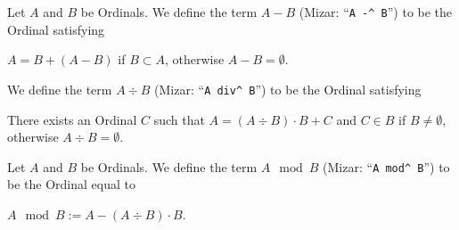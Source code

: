 \documentclass{article}
\begin{document}
\begin{definition}
Let $A$ and $B$ be Ordinals.
We define the term $A-B$ (Mizar: ``\verb#A -^ B#'') to be the Ordinal
satisfying
\begin{defn}
\item $A=B+(A-B)$ if $B\subset A$, otherwise $A-B=\emptyset$.
\end{defn}
We define the term $A\div B$ (Mizar: ``\verb#A div^ B#'') to be the
Ordinal satisfying
\begin{defn}
\item There exists an Ordinal $C$ such that $A=(A\div B)\cdot B+C$
  and $C\in B$ if $B\neq\emptyset$, otherwise $A\div B=\emptyset$.
\end{defn}
\end{definition}

\begin{definition}
Let $A$ and $B$ be Ordinals.
We define the term $A\mod B$ (Mizar: ``\verb#A mod^ B#'') to be the
Ordinal equal to
\begin{defn}
\item $A\mod B:=A-(A\div B)\cdot B$.
\end{defn}
\end{definition}
\end{document}
